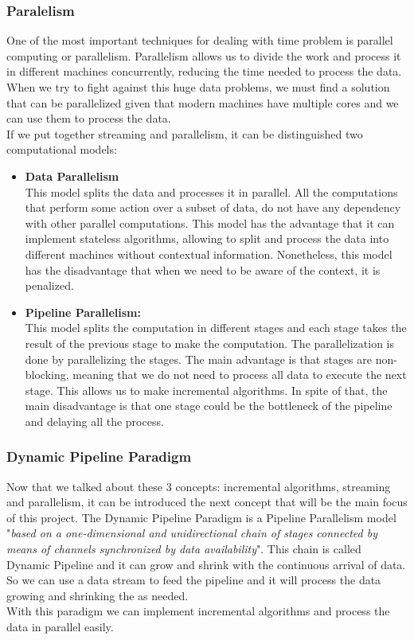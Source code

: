 \subsubsection*{Paralelism}
One of the most important techniques for dealing with time problem is parallel computing or parallelism.
Parallelism allows us to divide the work and process it in different machines concurrently, reducing the time needed to process the data.
When we try to fight against this huge data problems, we must find a solution that can be parallelized given that modern machines have multiple cores and we can use them to process the data.\\
If we put together streaming and parallelism, it can be distinguished two computational models:
\begin{itemize}
    \item \textbf{Data Parallelism} \\ 
        This model splits the data and processes it in parallel.
        All the computations that perform some action over a subset of data, do not have any dependency with other parallel computations.
        This model has the advantage that it can implement stateless algorithms, allowing to split and process the data into different machines without contextual information.
        Nonetheless, this model has the disadvantage that when we need to be aware of the context, it is penalized.
    \item \textbf{Pipeline Parallelism:} \\
        This model splits the computation in different stages and each stage takes the result of the previous stage to make the computation.
        The parallelization is done by parallelizing the stages.
        The main advantage is that stages are non-blocking, meaning that we do not need to process all data to execute the next stage.
        This allows us to make incremental algorithms.
        In spite of that, the main disadvantage is that one stage could be the bottleneck of the pipeline and delaying all the process.
    \end{itemize}
\subsubsection*{Dynamic Pipeline Paradigm}
Now that we talked about these 3 concepts: incremental algorithms, streaming and parallelism, it can be introduced the next concept that will be the main focus of this project.
The Dynamic Pipeline Paradigm is a Pipeline Parallelism model "\textit{based on a one-dimensional and unidirectional chain of stages connected by means of channels synchronized by data availability}". \cite*[][Page 9, 2.2]{juan_pablo_royo_sales_incremental_2021}
This chain is called Dynamic Pipeline and it can grow and shrink with the continuous arrival of data.
So we can use a data stream to feed the pipeline and it will process the data growing and shrinking the as needed. \\
With this paradigm we can implement incremental algorithms and process the data in parallel easily.

